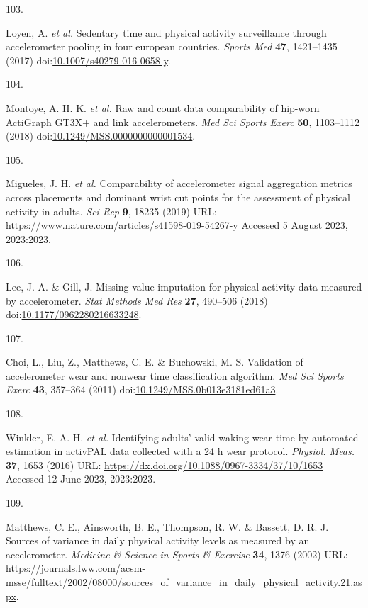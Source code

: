 \documentclass[
  10pt,
]{scrbook}
\newlength{\cslhangindent}
\newlength{\csllabelwidth}
\newlength{\cslentryspacingunit} %
\newenvironment{CSLReferences}[2] %
 {%
  \setlength{\parindent}{0pt}
  \ifodd #1
  \let\oldpar\par
  \def\par{\hangindent=\cslhangindent\oldpar}
  \fi
  \setlength{\parskip}{#2\cslentryspacingunit}
 }%
 {}
\newcommand{\CSLLeftMargin}[1]{\parbox[t]{\csllabelwidth}{#1}}
\newcommand{\CSLRightInline}[1]{\parbox[t]{\linewidth - \csllabelwidth}{#1}\break}
\let\originaltextbf\textbf
\renewcommand{\textbf}[1]{\textcolor{color1}{\originaltextbf{#1}}}
\begin{document}
\begin{CSLReferences}{0}{0}
\leavevmode{}%
\CSLLeftMargin{103. }%
\CSLRightInline{Loyen, A. \emph{et al.} Sedentary time and physical
activity surveillance through accelerometer pooling in four european
countries. \emph{Sports Med} \textbf{47}, 1421--1435 (2017)
doi:\href{https://doi.org/10.1007/s40279-016-0658-y}{10.1007/s40279-016-0658-y}.}

\leavevmode{}%
\CSLLeftMargin{104. }%
\CSLRightInline{Montoye, A. H. K. \emph{et al.} Raw and count data
comparability of hip-worn {ActiGraph} {GT}3X+ and link accelerometers.
\emph{Med Sci Sports Exerc} \textbf{50}, 1103--1112 (2018)
doi:\href{https://doi.org/10.1249/MSS.0000000000001534}{10.1249/MSS.0000000000001534}.}

\leavevmode{}%
\CSLLeftMargin{105. }%
\CSLRightInline{Migueles, J. H. \emph{et al.} Comparability of
accelerometer signal aggregation metrics across placements and dominant
wrist cut points for the assessment of physical activity in adults.
\emph{Sci Rep} \textbf{9}, 18235 (2019) URL:
\url{https://www.nature.com/articles/s41598-019-54267-y} Accessed 5
August 2023, 2023:2023.}

\leavevmode{}%
\CSLLeftMargin{106. }%
\CSLRightInline{Lee, J. A. \& Gill, J. Missing value imputation for
physical activity data measured by accelerometer. \emph{Stat Methods Med
Res} \textbf{27}, 490--506 (2018)
doi:\href{https://doi.org/10.1177/0962280216633248}{10.1177/0962280216633248}.}

\leavevmode{}%
\CSLLeftMargin{107. }%
\CSLRightInline{Choi, L., Liu, Z., Matthews, C. E. \& Buchowski, M. S.
Validation of accelerometer wear and nonwear time classification
algorithm. \emph{Med Sci Sports Exerc} \textbf{43}, 357--364 (2011)
doi:\href{https://doi.org/10.1249/MSS.0b013e3181ed61a3}{10.1249/MSS.0b013e3181ed61a3}.}

\leavevmode{}%
\CSLLeftMargin{108. }%
\CSLRightInline{Winkler, E. A. H. \emph{et al.} Identifying adults'
valid waking wear time by automated estimation in {activPAL} data
collected with a 24 h wear protocol. \emph{Physiol. Meas.} \textbf{37},
1653 (2016) URL: \url{https://dx.doi.org/10.1088/0967-3334/37/10/1653}
Accessed 12 June 2023, 2023:2023.}

\leavevmode{}%
\CSLLeftMargin{109. }%
\CSLRightInline{Matthews, C. E., Ainsworth, B. E., Thompson, R. W. \&
Bassett, D. R. J. Sources of variance in daily physical activity levels
as measured by an accelerometer. \emph{Medicine \& Science in Sports \&
Exercise} \textbf{34}, 1376 (2002) URL:
\url{https://journals.lww.com/acsm-msse/fulltext/2002/08000/sources_of_variance_in_daily_physical_activity.21.aspx}.}


\end{CSLReferences}
\end{document}
